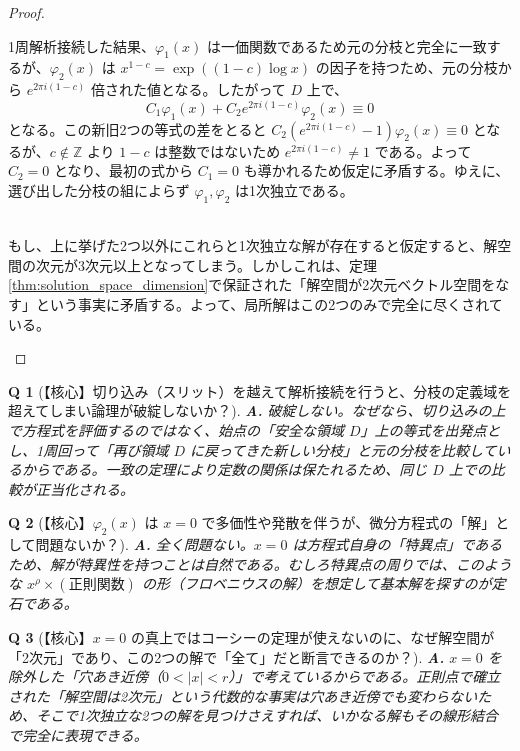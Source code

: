 \documentclass[paper=a4, fontsize=11pt]{jlreq} %
\theoremstyle{break}
\theoremstyle{qa}
\newtheorem*{Q}{Q}
\theoremstyle{remark} %
\begin{document}
\begin{proof}
\begin{description}
        1周解析接続した結果、$\varphi_1(x)$ は一価関数であるため元の分枝と完全に一致するが、$\varphi_2(x)$ は $x^{1-c} = \exp((1-c)\log x)$ の因子を持つため、元の分枝から $e^{2\pi i(1-c)}$ 倍された値となる。したがって $D$ 上で、
        \[
        C_{1}\varphi_{1}(x)+C_{2}e^{2\pi i(1-c)}\varphi_{2}(x)\equiv 0
        \]
        となる。この新旧2つの等式の差をとると $C_2(e^{2\pi i(1-c)}-1)\varphi_2(x) \equiv 0$ となるが、$c \notin \mathbb{Z}$ より $1-c$ は整数ではないため $e^{2\pi i(1-c)} \neq 1$ である。よって $C_2=0$ となり、最初の式から $C_1=0$ も導かれるため仮定に矛盾する。ゆえに、選び出した分枝の組によらず $\varphi_1, \varphi_2$ は1次独立である。
        
        \item[【ステップ3】解がこれら2つで全てであること]\mbox{}\\
        もし、上に挙げた2つ以外にこれらと1次独立な解が存在すると仮定すると、解空間の次元が3次元以上となってしまう。しかしこれは、定理\ref{thm:solution_space_dimension}で保証された「解空間が2次元ベクトル空間をなす」という事実に矛盾する。よって、局所解はこの2つのみで完全に尽くされている。
    \end{description}
\end{proof}

\begin{Q}[【核心】切り込み（スリット）を越えて解析接続を行うと、分枝の定義域を超えてしまい論理が破綻しないか？]
\textbf{A.} 破綻しない。なぜなら、切り込みの上で方程式を評価するのではなく、始点の「安全な領域 $D$」上の等式を出発点とし、1周回って「再び領域 $D$ に戻ってきた新しい分枝」と元の分枝を比較しているからである。一致の定理により定数の関係は保たれるため、同じ $D$ 上での比較が正当化される。
\end{Q}

\begin{Q}[【核心】$\varphi_{2}(x)$ は $x=0$ で多価性や発散を伴うが、微分方程式の「解」として問題ないか？]
\textbf{A.} 全く問題ない。$x=0$ は方程式自身の「特異点」であるため、解が特異性を持つことは自然である。むしろ特異点の周りでは、このような $x^\rho \times (\text{正則関数})$ の形（フロベニウスの解）を想定して基本解を探すのが定石である。
\end{Q}

\begin{Q}[【核心】$x=0$ の真上ではコーシーの定理が使えないのに、なぜ解空間が「2次元」であり、この2つの解で「全て」だと断言できるのか？]
\textbf{A.} $x=0$ を除外した「穴あき近傍（$0 < |x| < r$）」で考えているからである。正則点で確立された「解空間は2次元」という代数的な事実は穴あき近傍でも変わらないため、そこで1次独立な2つの解を見つけさえすれば、いかなる解もその線形結合で完全に表現できる。
\end{Q}
\end{document}
